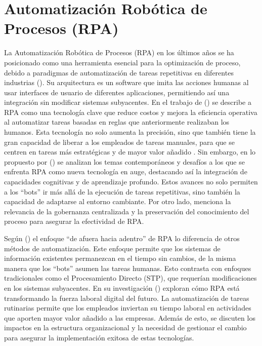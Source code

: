 \documentclass[letter,oneside,12pt,spanish]{report}
\begin{document}
\section{Automatización Robótica de Procesos (RPA)}

\noindent La Automatización Robótica de Procesos (RPA) en los últimos años se ha posicionado como una herramienta esencial para la optimización de proceso, debido a paradigmas de automatización de tareas repetitivas en diferentes industrias (\cite{doguc2020rpa}). Su arquitectura es un software que imita las acciones humanas al usar interfaces de usuario de diferentes aplicaciones, permitiendo así una integración sin modificar sistemas subyacentes. En el trabajo de (\cite{doguc2020rpa}) se describe a RPA como una tecnología clave que reduce costos y mejora la eficiencia operativa al automatizar tareas basadas en reglas que anteriormente realizaban los humanos. Esta tecnología no solo aumenta la precisión, sino que también tiene la gran capacidad de liberar a los empleados de tareas manuales, para que se centren en tareas más estratégicas y de mayor valor añadido . Sin embargo, en lo propuesto por (\cite{syed2020rpa}) se analizan los temas contemporáneos y desafíos a los que se enfrenta RPA como nueva tecnología en auge, destacando así la integración de capacidades cognitivas y de aprendizaje profundo. Estos avances no solo permiten a los “bots” ir más allá de la ejecución de tareas repetitivas, sino también la capacidad de adaptarse al entorno cambiante. Por otro lado, menciona la relevancia de la gobernanza centralizada y la preservación del conocimiento del proceso para asegurar la efectividad de RPA. 

\noindent Según (\cite{aalst2018bpm}) el enfoque “de afuera hacia adentro” de RPA lo diferencia de otros métodos de automatización. Este enfoque permite que los sistemas de información existentes permanezcan en el tiempo sin cambios, de la misma manera que los “bots” asumen las tareas humanas. Esto contrasta con enfoques tradicionales como el Procesamiento Directo (STP), que requerían modificaciones en los sistemas subyacentes. En su investigación (\cite{madakam2019rpa}) exploran cómo RPA está transformando la fuerza laboral digital del futuro. La automatización de tareas rutinarias permite que los empleados inviertan su tiempo laboral en actividades que aporten mayor valor añadido a las empresas. Además de esto, se discuten los impactos en la estructura organizacional y la necesidad de gestionar el cambio para asegurar la implementación exitosa de estas tecnologías.
\end{document}

